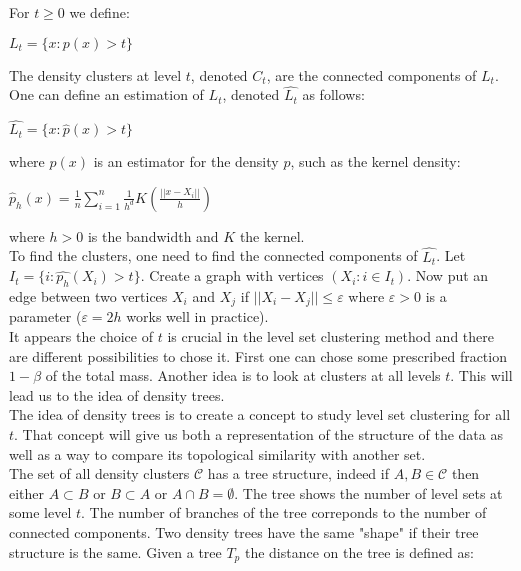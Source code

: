 \documentclass[12pt, a4paper]{article}
\begin{document}
For $t \ge 0$ we define:

  \begin{center}
    $L_t = \lbrace x : p(x) > t \rbrace$
  \end{center}

  The density clusters at level $t$, denoted $C_t$, are the connected components of $L_t$. One can define an estimation of $L_t$, denoted $\hat{L_t}$ as follows:\\
  \begin{center}
    $\widehat{L_t} = \lbrace x : \widehat{p}(x) > t \rbrace $
  \end{center}

  where $\widehat{p}(x)$ is an estimator for the density $p$, such as the kernel density:

  \begin{center}
    $\widehat{p}_h(x) = \frac{1}{n} \sum\limits_{i=1}^n \frac{1}{h^d} K (\frac{||x-X_i||}{h})$
  \end{center}

  where $h > 0$ is the bandwidth and $K$ the kernel.\\

  To find the clusters, one need to find the connected components  of $\widehat{L_t}$. Let $I_t = \lbrace i : \widehat{p_h}(X_i) > t \rbrace$. Create a graph with vertices $(X_i : i \in I_t)$. Now put an edge between two vertices $X_i$ and $X_j$ if $||X_i - X_j|| \le \varepsilon$ where $\varepsilon > 0$ is a parameter ($\varepsilon = 2h$ works well in practice).\\

  It appears the choice of $t$ is crucial in the level set clustering method and there are different possibilities to chose it. First one can chose some prescribed fraction $1-\beta$ of the total mass. Another idea is to look at clusters at all levels $t$. This will lead us to the idea of density trees.\\

  The idea of density trees is to create a concept to study level set clustering for all $t$. That concept will give us both a representation of the structure of the data as well as a way to compare its topological similarity with another set.\\

  The set of all density clusters $\mathcal{C}$ has a tree structure, indeed if $A,B \in \mathcal{C}$ then either $A \subset B$ or $B \subset A$ or $A \cap B = \emptyset$. The tree shows the number of level sets at some level $t$. The number of branches of the tree correponds to the number of connected components. Two density trees have the same "shape" if their tree structure is the same. Given a tree $T_p$ the distance on the tree is defined as: 
\end{document}
